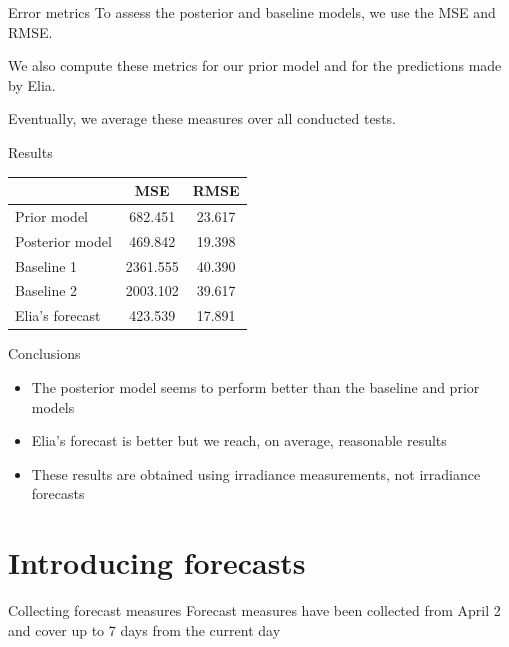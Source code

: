\documentclass[12pt]{beamer}
\begin{document}
\begin{frame}{Error metrics}
    To \alert{assess} the posterior and baseline models, we use the MSE and RMSE.
    
    We also compute these metrics for our prior model and for the predictions made by \alert{Elia}.
    
    Eventually, we \alert{average} these measures over all conducted tests.
\end{frame}

\begin{frame}{Results}
    \begin{table}
	\centering
    \begin{tabular}{l|c|c}
                        & MSE      & RMSE   \\ \hline
        Prior model     & 682.451  & 23.617 \\ \hline
        \alert{Posterior model} & 469.842  & 19.398 \\ \hline
        Baseline 1      & 2361.555 & 40.390 \\ \hline
        Baseline 2      & 2003.102 & 39.617 \\ \hline
        \alert{Elia's forecast} & 423.539  & 17.891
    \end{tabular}
    \label{tab:pv_metrics_meas}
\end{table}
\end{frame}

\begin{frame}{Conclusions}
    \begin{itemize}
        \item The \alert{posterior model} seems to perform \alert{better} than the baseline and prior models
        \item Elia's forecast is better but we reach, on average, \alert{reasonable} results
        \item These results are obtained using \alert{irradiance measurements}, not irradiance forecasts
    \end{itemize}
\end{frame}

\section{Introducing forecasts}

\begin{frame}{Collecting forecast measures}
    \alert{Forecast measures} have been collected from \alert{April 2} and cover up to 7 days from the current day
\end{frame}
\end{document}
